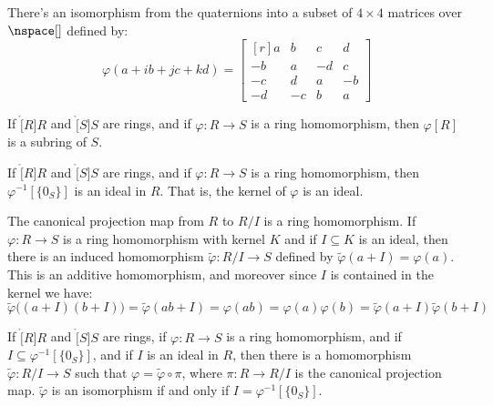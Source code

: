             \begin{example}
                There's an isomorphism from the quaternions into a subset of
                $4\times{4}$ matrices over $\nspace[]$ defined by:
                \begin{equation}
                    \varphi(a+ib+jc+kd)=
                    \begin{bmatrix*}[r]
                        a&b&c&d\\
                        \minus{b}&a&\minus{d}&c\\
                        \minus{c}&d&a&\minus{b}\\
                        \minus{d}&\minus{c}&b&a
                    \end{bmatrix*}
                \end{equation}
            \end{example}
            \begin{theorem}
                If $\ring[R]{R}$ and $\ring[S]{S}$ are rings, and if
                $\varphi:R\rightarrow{S}$ is a ring homomorphism, then
                $\varphi[R]$ is a subring of $S$.
            \end{theorem}
            \begin{theorem}
                If $\ring[R]{R}$ and $\ring[S]{S}$ are rings, and if
                $\varphi:R\rightarrow{S}$ is a ring homomorphism, then
                $\varphi^{\minus{1}}[\{0_{S}\}]$ is an ideal in $R$. That
                is, the kernel of $\varphi$ is an ideal.
            \end{theorem}
            The canonical projection map from $R$ to $R/I$ is a ring
            homomorphism. If $\varphi:R\rightarrow{S}$ is a ring
            homomorphism with kernel $K$ and if $I\subseteq{K}$ is an ideal,
            then there is an induced homomorphism
            $\tilde{\varphi}:R/I\rightarrow{S}$ defined by
            $\tilde{\varphi}(a+I)=\varphi(a)$. This is an additive
            homomorphism, and moreover since $I$ is contained in the kernel
            we have:
            \begin{equation}
                \tilde{\varphi}\big((a+I)(b+I)\big)=\tilde{\varphi}(ab+I)
                =\varphi(ab)=\varphi(a)\varphi(b)
                =\tilde{\varphi}(a+I)\tilde{\varphi}(b+I)
            \end{equation}
            \begin{theorem}
                If $\ring[R]{R}$ and $\ring[S]{S}$ are rings, if
                $\varphi:R\rightarrow{S}$ is a ring homomorphism, and if
                $I\subseteq\varphi^{\minus{1}}[\{0_{S}\}]$, and if $I$ is an
                ideal in $R$, then there is a homomorphism
                $\tilde{\varphi}:R/I\rightarrow{S}$ such that
                $\varphi=\tilde{\varphi}\circ\pi$, where
                $\pi:R\rightarrow{R}/I$ is the canonical projection map.
                $\tilde{\varphi}$ is an isomorphism if and only if
                $I=\varphi^{\minus{1}}[\{0_{S}\}]$.
            \end{theorem}
